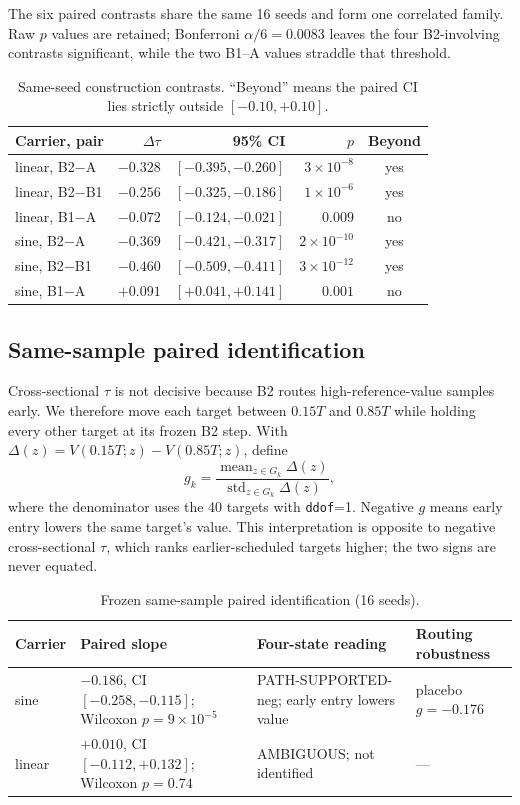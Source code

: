 \documentclass{article}
\begin{document}
The six paired contrasts share the same 16 seeds and form one correlated family. Raw $p$ values
are retained; Bonferroni $\alpha/6=0.0083$ leaves the four B2-involving contrasts significant, while
the two B1--A values straddle that threshold.

\begin{table}[t]
\centering\footnotesize
\caption{Same-seed construction contrasts. ``Beyond'' means the paired CI lies strictly outside
$[-0.10,+0.10]$.}
\label{tab:paired-constructions}
\begin{tabular}{lrrrc}
\toprule
Carrier, pair & $\Delta\tau$ & 95\% CI & $p$ & Beyond \\
\midrule
linear, B2$-$A & $-0.328$ & $[-0.395,-0.260]$ & $3\times10^{-8}$ & yes \\
linear, B2$-$B1 & $-0.256$ & $[-0.325,-0.186]$ & $1\times10^{-6}$ & yes \\
linear, B1$-$A & $-0.072$ & $[-0.124,-0.021]$ & $0.009$ & no \\
sine, B2$-$A & $-0.369$ & $[-0.421,-0.317]$ & $2\times10^{-10}$ & yes \\
sine, B2$-$B1 & $-0.460$ & $[-0.509,-0.411]$ & $3\times10^{-12}$ & yes \\
sine, B1$-$A & $+0.091$ & $[+0.041,+0.141]$ & $0.001$ & no \\
\bottomrule
\end{tabular}
\end{table}

\subsection{Same-sample paired identification}
Cross-sectional $\tau$ is not decisive because B2 routes high-reference-value samples early. We
therefore move each target between $0.15T$ and $0.85T$ while holding every other target at its
frozen B2 step. With $\Delta(z)=V(0.15T;z)-V(0.85T;z)$, define
\begin{equation}
g_k=\frac{\operatorname{mean}_{z\in G_k}\Delta(z)}
{\operatorname{std}_{z\in G_k}\Delta(z)},
\label{eq:paired-g}
\end{equation}
where the denominator uses the 40 targets with \texttt{ddof}=1. Negative $g$ means early entry
lowers the same target's value. This interpretation is opposite to negative cross-sectional $\tau$,
which ranks earlier-scheduled targets higher; the two signs are never equated.

\begin{table}[t]
\centering\small
\caption{Frozen same-sample paired identification (16 seeds).}
\label{tab:paired-id}
\begin{tabularx}{\linewidth}{@{}lXXX@{}}
\toprule
Carrier & Paired slope & Four-state reading & Routing robustness \\
\midrule
sine & $-0.186$, CI $[-0.258,-0.115]$; Wilcoxon $p=9\times10^{-5}$ & PATH-SUPPORTED-neg; early entry lowers value & placebo $g=-0.176$ \\
linear & $+0.010$, CI $[-0.112,+0.132]$; Wilcoxon $p=0.74$ & AMBIGUOUS; not identified & --- \\
\bottomrule
\end{tabularx}
\end{table}
\end{document}
